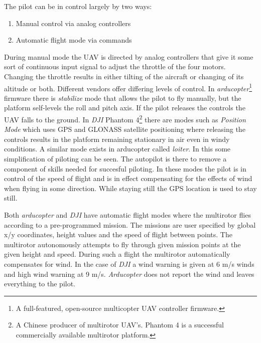 \documentclass[12pt,oneside]{reedthesis}
\providecommand{\tightlist}{%
  \setlength{\itemsep}{0pt}\setlength{\parskip}{0pt}}
\theoremstyle{definition}
\theoremstyle{definition}
\theoremstyle{definition}
\theoremstyle{remark}
\begin{document}
The pilot can be in control largely by two ways:
\begin{enumerate}
\def\labelenumi{\arabic{enumi}.}
\tightlist
\item
  Manual control via analog controllers
\item
  Automatic flight mode via commands
\end{enumerate}
During manual mode the UAV is directed by analog controllers that give
it some sort of continuous input signal to adjust the throttle of the
four motors. Changing the throttle results in either tilting of the
aircraft or changing of its altitude or both. Different vendors offer
differing levels of control. In \emph{arducopter}\footnote{A
  full-featured, open-source multicopter UAV controller firmware.}
firmware there is \emph{stabilize} mode that allows the pilot to fly
manually, but the platform self-levels the roll and pitch axis. If the
pilot releases the controls the UAV falls to the ground. In \emph{DJI}
Phantom 4\footnote{A Chinese producer of multirotor UAV's. Phantom 4 is
  a successful commercially available multirotor platform.} there are
modes such as \emph{Position Mode} which uses GPS and GLONASS satellite
positioning where releasing the controls results in the platform
remaining stationary in air even in windy conditions. A similar mode
exists in arducopter called \emph{loiter}. In this some simplification
of piloting can be seen. The autopilot is there to remove a component of
skills needed for succesful piloting. In these modes the pilot is in
control of the speed of flight and is in effect compensating for the
effects of wind when flying in some direction. While staying still the
GPS location is used to stay still.

Both \emph{arducopter} and \emph{DJI} have automatic flight modes where
the multirotor flies according to a pre-programmed mission. The missions
are user specified by global x/y coordinates, height values and the
speed of flight between points. The multirotor autonomously attempts to
fly through given mission points at the given height and speed. During
such a flight the multirotor automatically compensates for wind. In the
case of \emph{DJI} a wind warning is given at 6 m/s winds and high wind
warning at 9 m/s. \emph{Arducopter} does not report the wind and leaves
everything to the pilot.
\end{document}

